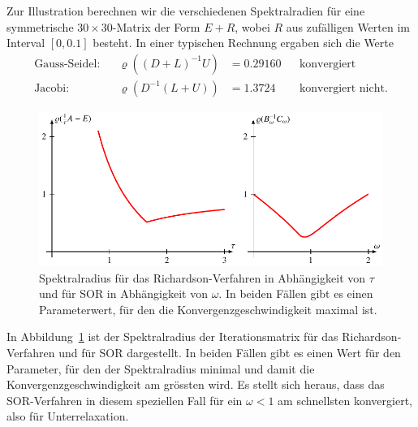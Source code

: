 \begin{beispiel}
Zur Illustration berechnen wir die verschiedenen Spektralradien für
eine symmetrische $30\times 30$-Matrix der Form $E + R$,
wobei $R$ aus zufälligen Werten
im Interval $[0,0.1]$ besteht.
In einer typischen Rechnung ergaben sich die Werte
\[
\begin{aligned}
\text{Gauss-Seidel:}&&
\varrho((D+L)^{-1}U) &=  0.29160
&&\text{konvergiert}
\\
\text{Jacobi:}&&
\varrho(D^{-1}(L+U)) &=  1.3724
&&\text{konvergiert nicht.}
\end{aligned}
\]
\begin{figure}
\centering
\includegraphics{chapters/60-linsys/images/sp.pdf}
\caption{Spektralradius für das Richardson-Verfahren in Abhängigkeit
von $\tau$ und für SOR in Abhängigkeit von $\omega$.
In beiden Fällen gibt es einen Parameterwert, für den die
Konvergenzgeschwindigkeit maximal ist.
\label{buch:figure:spektralradius}}
\end{figure}%
In Abbildung~\ref{buch:figure:spektralradius}
ist der Spektralradius der Iterationsmatrix für
das Richardson-Verfahren und für SOR dargestellt.
In beiden Fällen gibt es einen Wert für den Parameter,
für den der Spektralradius minimal und damit die Konvergenzgeschwindigkeit
am grössten wird.
Es stellt sich heraus, dass das SOR-Verfahren in diesem speziellen Fall
für ein $\omega<1$ am schnellsten konvergiert, also für Unterrelaxation.
\end{beispiel}



